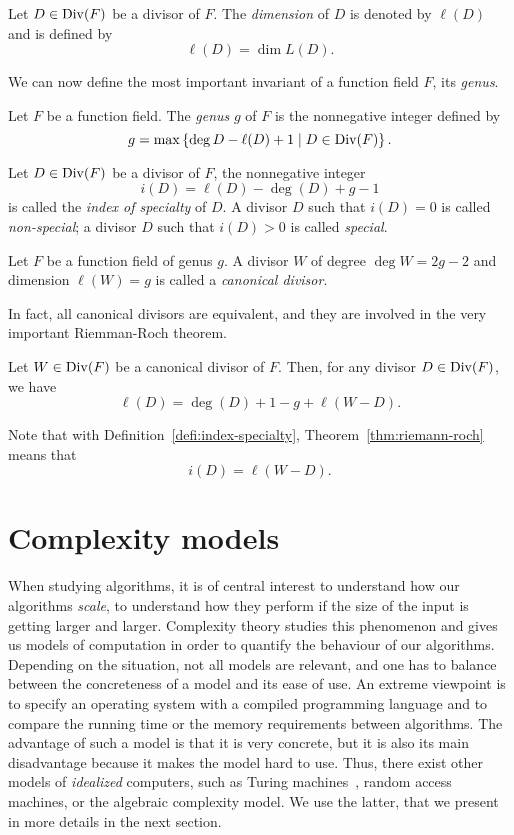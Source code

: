 \begin{defi}[Dimension]
  Let $D\in\operatorname{Div}(F)$ be a divisor of $F$. The \emph{dimension} of $D$ is denoted
  by $\ell(D)$ and is defined by
  \[
    \ell(D) = \dim L(D).
  \]
\end{defi}
We can now define the most important invariant of a function field $F$, its
\emph{genus}.
\begin{defi}[Genus]
  Let $F$ be a function field. The \emph{genus} $g$ of $F$ is the nonnegative
  integer defined by
  \[
    g = \max\left\{ \deg D-\ell(D)+1\mid D\in\operatorname{Div}(F) \right\}.
  \]
\end{defi}
\begin{defi}
  \label{defi:index-specialty}
  Let $D\in\operatorname{Div}(F)$ be a divisor of $F$, the nonnegative integer
  \[
    i(D) = \ell(D) - \deg(D) + g - 1
  \]
  is called the \emph{index of specialty} of $D$. A divisor $D$ such that
  $i(D)=0$ is called \emph{non-special}; a divisor $D$ such that $i(D)>0$ is
  called \emph{special}.
\end{defi}
\begin{defi}
  Let $F$ be a function field of genus $g$. A divisor $W$ of degree $\deg W = 2g-2$ and
  dimension $\ell(W) = g$ is called a \emph{canonical divisor}.
\end{defi}
In fact, all canonical divisors are equivalent, and they are involved in the
very important Riemman-Roch theorem.
\begin{thm}
  \label{thm:riemann-roch}
  Let $W\in\operatorname{Div}(F)$ be a canonical divisor of $F$. Then, for any divisor
  $D\in\operatorname{Div}(F)$, we have
  \[
    \ell(D) = \deg(D) + 1 - g + \ell(W-D).
  \]
\end{thm}
\begin{rem}
Note that with Definition~\ref{defi:index-specialty},
Theorem~\ref{thm:riemann-roch} means that
\[
  i(D) = \ell(W-D).
\]
\end{rem}

\section{Complexity models}
\label{sec:complexity-models}

When studying algorithms, it is of central interest to understand how our algorithms
\emph{scale}, \ie to understand how they perform if the size of the input is
getting larger and larger. Complexity theory studies this phenomenon and gives us models
of computation in order to quantify the behaviour of our algorithms. Depending
on the situation, not all models are relevant, and one has to balance between
the concreteness of a model and its ease of use. An extreme viewpoint is to
specify an operating system with a compiled programming language and to compare
the running time or the memory requirements between algorithms. The advantage of
such a model is that it is very concrete, but it is also its main disadvantage
because it makes the model hard to use. Thus, there exist other models of
\emph{idealized} computers, such as Turing machines~\cite{Papadimitriou03},
random access machines, or the algebraic complexity model.
We use the latter, that we present in more details in the next section.

